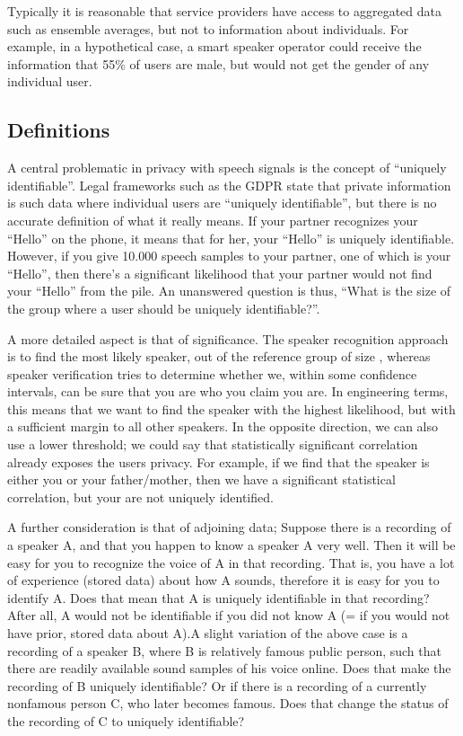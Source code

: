 \documentclass[letterpaper,10pt,english]{jupyterBook}
\begin{document}
\sphinxAtStartPar
Typically it is reasonable that service providers have access to
aggregated data such as ensemble averages, but not to information about
individuals. For example, in a hypothetical case, a smart speaker
operator could receive the information that 55\% of users are male, but
would not get the gender of any individual user.


\subsection{Definitions}
\label{\detokenize{Security_and_privacy:definitions}}
\sphinxAtStartPar
A central problematic in privacy with speech signals is the concept of
“uniquely identifiable”. Legal frameworks such as the GDPR state that
private information is such data where individual users are “uniquely
identifiable”, but there is no accurate definition of what it really
means. If your partner recognizes your “Hello” on the phone, it means
that for her, your “Hello” is uniquely identifiable. However, if you
give 10.000 speech samples to your partner, one of which is your
“Hello”, then there’s a significant likelihood that your partner would
not find your “Hello” from the pile. An unanswered question is thus,
“What is the size of the group where a user should be uniquely
identifiable?”.

\sphinxAtStartPar
A more detailed aspect is that of significance. The speaker recognition
approach is to find the most likely speaker, out of the reference group
of size , whereas speaker verification tries to determine whether we,
within some confidence intervals, can be sure that you are who you claim
you are. In engineering terms, this means that we want to find the
speaker with the highest likelihood, but with a sufficient margin to all
other speakers. In the opposite direction, we can also use a lower
threshold; we could say that statistically significant correlation
already exposes the users privacy. For example, if we find that the
speaker is either you or your father/mother, then we have a significant
statistical correlation, but your are not uniquely identified.

\sphinxAtStartPar
A further consideration is that of adjoining data; Suppose there is a
recording of a speaker A, and that you happen to know a speaker A very
well. Then it will be easy for you to recognize the voice of A in that
recording. That is, you have a lot of experience (stored data) about how
A sounds, therefore it is easy for you to identify A. Does that mean
that A is uniquely identifiable in that recording? After all, A would
not be identifiable if you did not know A (= if you would not have
prior, stored data about A).A slight variation of the above case is a recording of a speaker B,
where B is relatively famous public person, such that there are readily
available sound samples of his voice on\sphinxhyphen{}line. Does that make the
recording of B uniquely identifiable? Or if there is a recording of a
currently non\sphinxhyphen{}famous person C, who later becomes famous. Does that
change the status of the recording of C to uniquely identifiable?
\end{document}
